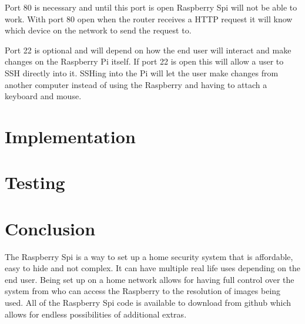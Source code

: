 \documentclass[]{report}   %
\begin{document}
Port 80 is necessary and until this port is open Raspberry Spi will not be able to work. With port 80 open when the router receives a HTTP request it will know which device on the network to send the request to.

Port 22 is optional and will depend on how the end user will interact and make changes on the Raspberry Pi itself. If port 22 is open this will allow a user to SSH directly into it. SSHing into the Pi will let the user make changes from another computer instead of using the Raspberry and having to attach a keyboard and mouse.


%
%
\chapter {Implementation}
\label {ch:implem}
%
%
%
\chapter {Testing}
\label {ch:test}
%
%
%
%
%
\chapter {Conclusion}
\label {ch:concl}
%
%
%
%
%
\begin{small}
 The Raspberry Spi is a way to set up a home security system that is affordable, easy to hide and not complex. It can have multiple real life uses depending on the end user. Being set up on a home network allows for having full control over the system from who can access the Raspberry to the resolution of images being used. All of the Raspberry Spi code is available to download from github which allows for endless possibilities of additional extras.
\end{small}

\end{document}
